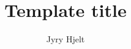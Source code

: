 \documentclass{article}
\title{Template title}
\author{Jyry Hjelt}
\begin{document}
\blindtext \cite{DUMMY:1}

\printbibliography
\end{document}
